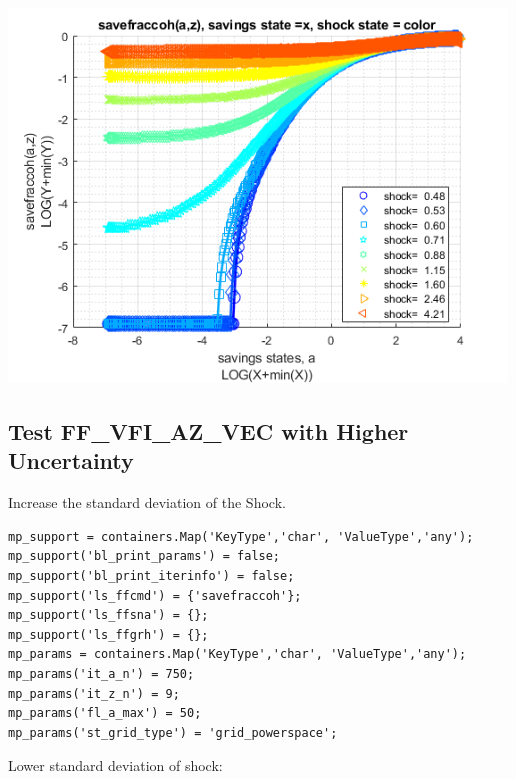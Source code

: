 \documentclass[
]{book}
\begin{document}
\includegraphics[width=5.20833in,height=\textheight]{img/fx_vfi_az_vec_images/figure_5.png}

\hypertarget{test-ff_vfi_az_vec-with-higher-uncertainty}{%
\subsection{Test FF\_VFI\_AZ\_VEC with Higher Uncertainty}\label{test-ff_vfi_az_vec-with-higher-uncertainty}}

Increase the standard deviation of the Shock.

\begin{verbatim}
mp_support = containers.Map('KeyType','char', 'ValueType','any');
mp_support('bl_print_params') = false;
mp_support('bl_print_iterinfo') = false;
mp_support('ls_ffcmd') = {'savefraccoh'};
mp_support('ls_ffsna') = {};
mp_support('ls_ffgrh') = {};
mp_params = containers.Map('KeyType','char', 'ValueType','any');
mp_params('it_a_n') = 750;
mp_params('it_z_n') = 9;
mp_params('fl_a_max') = 50;
mp_params('st_grid_type') = 'grid_powerspace';
\end{verbatim}

Lower standard deviation of shock:
\end{document}
